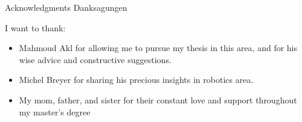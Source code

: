\makeatletter
{}
{}
{}
\makeatother
\thispagestyle{empty}

\vspace*{20mm}

\begin{center}
\makeatletter
{}
{ Acknowledgments}
{ Danksagungen}
\makeatother
\end{center}

\vspace{10mm}

I want to thank:
\begin{itemize}
    \item Mahmoud Akl for allowing me to pursue my thesis in this area, and for his wise advice and constructive suggestions. 
    \item Michel Breyer for sharing his precious insights in robotics area.
    \item My mom, father, and sister for their constant love and support throughout my master's degree
\end{itemize}

\cleardoublepage{}
